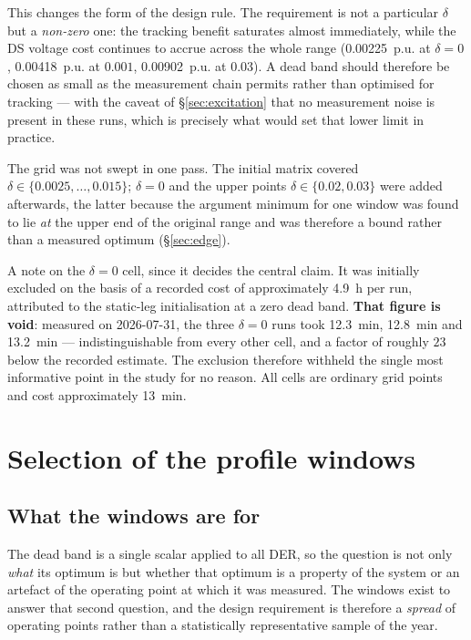 \documentclass[11pt,a4paper]{article}
\newcommand{\pu}{\ensuremath{\mathrm{p.u.}}}
\newcommand{\dz}{\ensuremath{\delta}}
\begin{document}
This changes the form of the design rule. The requirement is not a particular
$\dz$ but a \emph{non-zero} one: the tracking benefit saturates almost
immediately, while the DS voltage cost continues to accrue across the whole
range (\SI{0.00225}{\pu} at $\dz=0$, \SI{0.00418}{\pu} at $0.001$,
\SI{0.00902}{\pu} at $0.03$). A dead band should therefore be chosen as small as
the measurement chain permits rather than optimised for tracking --- with the
caveat of \S\ref{sec:excitation} that no measurement noise is present in these
runs, which is precisely what would set that lower limit in practice.

The grid was not swept in one pass. The initial matrix covered
$\dz\in\{0.0025,\dots,0.015\}$; $\dz=0$ and the upper points
$\dz\in\{0.02,0.03\}$ were added afterwards, the latter because the argument
minimum for one window was found to lie \emph{at} the upper end of the original
range and was therefore a bound rather than a measured optimum
(\S\ref{sec:edge}).

A note on the $\dz=0$ cell, since it decides the central claim. It was
initially excluded on the basis of a recorded cost of approximately
\SI{4.9}{\hour} per run, attributed to the static-leg initialisation at a zero
dead band. \textbf{That figure is void}: measured on 2026-07-31, the three
$\dz=0$ runs took \SI{12.3}{\minute}, \SI{12.8}{\minute} and
\SI{13.2}{\minute} --- indistinguishable from every other cell, and a factor of
roughly $23$ below the recorded estimate. The exclusion therefore withheld the
single most informative point in the study for no reason. All cells are
ordinary grid points and cost approximately \SI{13}{\minute}.

\section{Selection of the profile windows}
\label{sec:windows}

\subsection{What the windows are for}

The dead band is a single scalar applied to all DER, so the question is not
only \emph{what} its optimum is but whether that optimum is a property of the
system or an artefact of the operating point at which it was measured. The
windows exist to answer that second question, and the design requirement is
therefore a \emph{spread} of operating points rather than a statistically
representative sample of the year.
\end{document}
